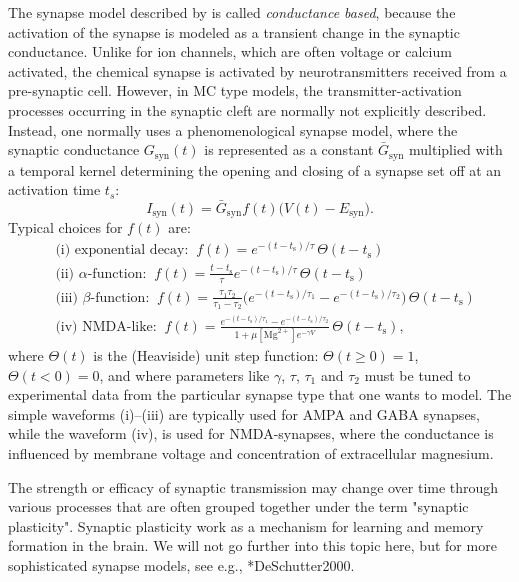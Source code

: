 The synapse model described by  is called \textit{conductance based}, because the activation of the synapse is modeled as a transient change in the synaptic conductance. Unlike for ion channels, which are often voltage or calcium activated, the chemical synapse is activated by neurotransmitters received from a pre-synaptic cell. However, in MC type models, the transmitter-activation processes occurring in the synaptic cleft are normally not explicitly described. Instead, one normally uses a phenomenological synapse model, where the synaptic conductance $G_\text{syn}(t)$ is represented as a constant $\bar{G}_\text{syn}$ multiplied with a temporal kernel determining the opening and closing of a synapse set off at an activation time $t_s$:
\begin{equation}
I_\text{syn}(t) = \bar{G}_\text{syn} f(t) \big(V(t)-E_\text{syn} \big).
\label{eq:Neuron:chemicalsynapse}
\end{equation}
Typical choices for $f(t)$ are: 
\begin{align}
&\text{(i) exponential decay:} \;\; f(t) = e^{-(t-t_\text{s})/\tau}\, \Theta(t-t_\text{s}) \\
&\text{(ii) $\alpha$-function:} \;\; f(t) =  \frac{t-t_\text{s}}{\tau} e^{-(t-t_\text{s})/\tau} \, \Theta(t-t_\text{s}) \\
&\text{(iii) $\beta$-function:} \;\; f(t) = \frac{\tau_1 \tau_2}{\tau_1-\tau_2} 
\Big( e^{-(t-t_\text{s})/\tau_1} - e^{-(t-t_\text{s})/\tau_2} \Big) \, \Theta(t-t_\text{s}) \\
& \text{(iv) NMDA-like:} \;\; f(t) = \frac{e^{-(t-t_\text{s})/\tau_1} - e^{-(t-t_\text{s})/\tau_2}} {1+\mu [\text{Mg}^{2+}] e^{-\gamma V} } \, \Theta(t-t_\text{s}),
\label{eq:Neuron:sf4}
\end{align}
where $\Theta(t)$ is the (Heaviside) unit step function: $\Theta(t \ge 0)=1$,  $\Theta(t< 0)=0$, and where parameters like $\gamma$,  $\tau$, $\tau_1$ and $\tau_2$ must be tuned to experimental data from the particular synapse type that one wants to model. The simple waveforms (i)--(iii) are typically used for AMPA  and GABA synapses, while the waveform (iv), is used for NMDA-synapses, where the conductance is influenced by membrane voltage and concentration of extracellular magnesium. 

The strength or efficacy of synaptic transmission may change over time through various processes that are often grouped together under the term "synaptic plasticity". Synaptic plasticity work as a mechanism for learning and memory formation in the brain. We will not go further into this topic here, but for more sophisticated synapse models, see e.g.,  \citeasnoun**{DeSchutter2000}.

